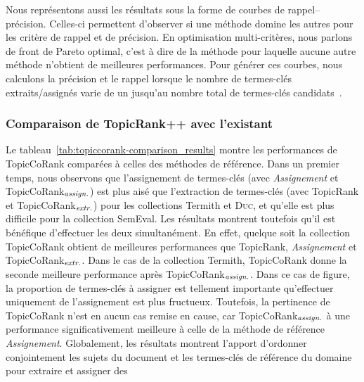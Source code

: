         Nous représentons aussi les résultats sous la forme de courbes de
        rappel--précision. Celles-ci permettent d'observer si une méthode domine
        les autres pour les critère de rappel et de précision. En optimisation
        multi-critères, nous parlons de front de Pareto optimal, c'est à dire de
        la méthode pour laquelle aucune autre méthode n'obtient de meilleures
        performances. Pour générer ces courbes, nous calculons la précision et
        le rappel lorsque  le nombre de termes-clés extraits/assignés varie de
        un jusqu'au nombre total de termes-clés
        candidats~\cite{hassan2010conundrums}.
      
      \subsubsection{Comparaison de TopicRank++ avec l'existant}
      \label{subsubsec:main-automatic_keyphrase_annotation-supervised_automatic_keyphrase_annotation-evaluation-comparison}
        Le tableau~\ref{tab:topiccorank-comparison_results} montre les
        performances de TopicCoRank comparées à celles des méthodes de
        référence. Dans un premier temps, nous observons que l'assignement de
        termes-clés (avec \textit{Assignement} et
        TopicCoRank$_\textnormal{\textit{assign.}}$) est plus aisé que
        l'extraction de termes-clés (avec TopicRank et
        TopicCoRank$_\textnormal{\textit{extr.}}$) pour les collections Termith
        et \textsc{Duc}, et qu'elle est plus difficile pour la collection
        SemEval. Les résultats montrent toutefois qu'il est bénéfique
        d'effectuer les deux simultanément. En effet, quelque soit la collection
        TopicCoRank obtient de meilleures performances que TopicRank,
        \textit{Assignement} et TopicCoRank$_\textnormal{\textit{extr.}}$. Dans
        le cas de la collection Termith, TopicCoRank donne la seconde meilleure
        performance après TopicCoRank$_\textnormal{\textit{assign.}}$. Dans ce
        cas de figure, la proportion de termes-clés \og{}à assigner\fg{} est
        tellement importante qu'effectuer uniquement de l'assignement est plus
        fructueux. Toutefois, la pertinence de TopicCoRank n'est en aucun cas
        remise en cause, car TopicCoRank$_\textnormal{\textit{assign.}}$ à une
        performance significativement meilleure à celle de la méthode de
        référence \textit{Assignement}. Globalement, les résultats montrent
        l'apport d'ordonner conjointement les sujets du document et les
        termes-clés de référence du domaine pour extraire et assigner des
